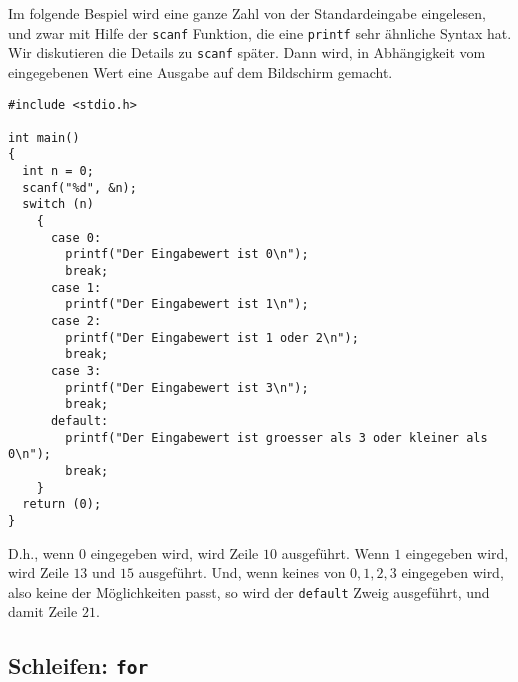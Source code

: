 Im folgende Bespiel wird eine ganze Zahl von der Standardeingabe eingelesen, und zwar mit Hilfe der \verb|scanf| Funktion, die eine \verb|printf| sehr ähnliche Syntax hat.
Wir diskutieren die Details zu \verb|scanf| später.
Dann wird, in Abhängigkeit vom eingegebenen Wert eine Ausgabe auf dem Bildschirm gemacht.
\begin{lstlisting}
#include <stdio.h>

int main()
{
  int n = 0;
  scanf("%d", &n);
  switch (n)
    {
      case 0:
        printf("Der Eingabewert ist 0\n");
        break;
      case 1:
        printf("Der Eingabewert ist 1\n");
      case 2:
        printf("Der Eingabewert ist 1 oder 2\n");
        break;
      case 3:
        printf("Der Eingabewert ist 3\n");
        break;
      default:
        printf("Der Eingabewert ist groesser als 3 oder kleiner als 0\n");
        break;
    }
  return (0);
}
\end{lstlisting}
D.h., wenn $0$ eingegeben wird, wird Zeile $10$ ausgeführt.
Wenn $1$ eingegeben wird, wird Zeile $13$ und $15$ ausgeführt.
Und, wenn keines von $0,1,2,3$ eingegeben wird, also keine der Möglichkeiten passt, so wird der \verb|default| Zweig ausgeführt, und damit Zeile $21$.

\subsection{Schleifen: \texttt{for}}

